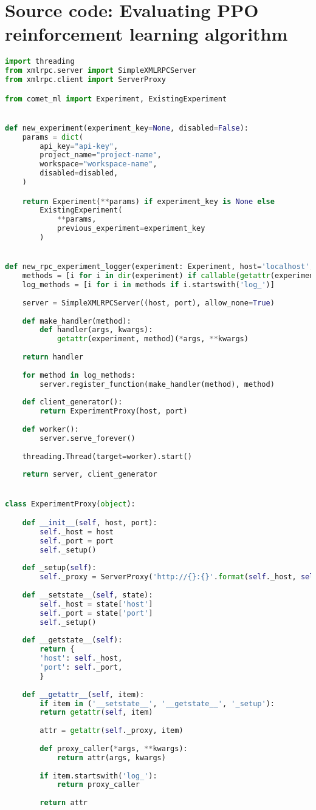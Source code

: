\chapter{Source code: Evaluating PPO reinforcement learning algorithm}

\begin{lstlisting}[language=Python, caption=comet.py: Logs experiment results and model weights to comet.ml platform]
import threading
from xmlrpc.server import SimpleXMLRPCServer
from xmlrpc.client import ServerProxy

from comet_ml import Experiment, ExistingExperiment


def new_experiment(experiment_key=None, disabled=False):
	params = dict(
		api_key="api-key",
		project_name="project-name",
		workspace="workspace-name",
		disabled=disabled,
	)

	return Experiment(**params) if experiment_key is None else 
		ExistingExperiment(
			**params,
			previous_experiment=experiment_key
		)


def new_rpc_experiment_logger(experiment: Experiment, host='localhost', port=8085):
	methods = [i for i in dir(experiment) if callable(getattr(experiment, i))]
	log_methods = [i for i in methods if i.startswith('log_')]
	
	server = SimpleXMLRPCServer((host, port), allow_none=True)
	
	def make_handler(method):
		def handler(args, kwargs):
			getattr(experiment, method)(*args, **kwargs)
	
	return handler
	
	for method in log_methods:
		server.register_function(make_handler(method), method)
	
	def client_generator():
		return ExperimentProxy(host, port)
	
	def worker():
		server.serve_forever()
	
	threading.Thread(target=worker).start()
	
	return server, client_generator


class ExperimentProxy(object):

	def __init__(self, host, port):
		self._host = host
		self._port = port
		self._setup()
	
	def _setup(self):
		self._proxy = ServerProxy('http://{}:{}'.format(self._host, self._port), allow_none=True)
	
	def __setstate__(self, state):
		self._host = state['host']
		self._port = state['port']
		self._setup()
	
	def __getstate__(self):
		return {
		'host': self._host,
		'port': self._port,
		}
	
	def __getattr__(self, item):
		if item in ('__setstate__', '__getstate__', '_setup'):
		return getattr(self, item)
		
		attr = getattr(self._proxy, item)
	
		def proxy_caller(*args, **kwargs):
			return attr(args, kwargs)
			
		if item.startswith('log_'):
			return proxy_caller
			
		return attr

\end{lstlisting}




